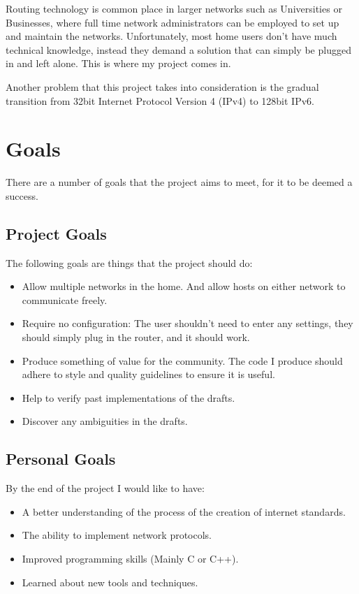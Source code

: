 \documentclass[12pt]{report}
\begin{document}
Routing technology is common place in larger networks such as Universities or
Businesses, where full time network administrators can be employed to set up and
maintain the networks. Unfortunately, most home users don't have much technical
knowledge, instead they demand a solution that can simply be plugged in and left
alone. This is where my project comes in. 


Another problem that this project takes into consideration is the gradual
transition from 32bit Internet Protocol Version 4 (IPv4) to 128bit IPv6. 

\section{Goals}
There are a number of goals that the project aims to meet, for it to be deemed
a success.

\subsection{Project Goals }
The following goals are things that the project should do:

\begin{itemize}
	\item Allow multiple networks in the home. And allow hosts on either
	network to communicate freely. 
	\item Require no configuration: The user shouldn't need to enter any 
	settings, they should simply plug in the router, and it should  work.
	\item Produce something of value for the community. The code I produce  
	should adhere to style and quality guidelines to ensure it is useful.
	\item Help to verify past implementations of the drafts.
	\item Discover any ambiguities in the drafts.
\end{itemize}

\subsection{Personal Goals}
By the end of the project I would like to have:

\begin{itemize}
	\item A better understanding of the process of the creation of internet
	standards.
	\item The ability to implement network protocols. 
	\item Improved programming skills (Mainly C or C++).
	\item Learned about new tools and techniques.
\end{itemize}
\end{document}
